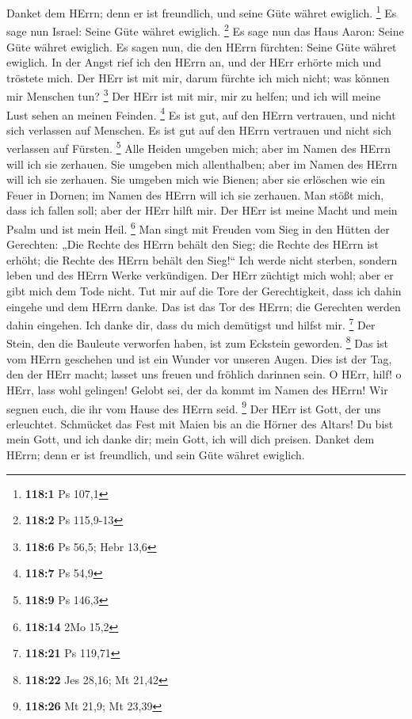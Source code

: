  Danket dem HErrn; denn er ist freundlich, und seine Güte
währet ewiglich. \footnote{\textbf{118:1} Ps 107,1}  Es
sage nun Israel: Seine Güte währet ewiglich. \footnote{\textbf{118:2} Ps
  115,9-13}  Es sage nun das Haus Aaron: Seine Güte währet
ewiglich.  Es sagen nun, die den HErrn fürchten: Seine
Güte währet ewiglich.  In der Angst rief ich den HErrn an,
und der HErr erhörte mich und tröstete mich.  Der HErr ist
mit mir, darum fürchte ich mich nicht; was können mir Menschen tun?
\footnote{\textbf{118:6} Ps 56,5; Hebr 13,6}  Der HErr ist
mit mir, mir zu helfen; und ich will meine Lust sehen an meinen Feinden.
\footnote{\textbf{118:7} Ps 54,9}  Es ist gut, auf den
HErrn vertrauen, und nicht sich verlassen auf Menschen. 
Es ist gut auf den HErrn vertrauen und nicht sich verlassen auf Fürsten.
\footnote{\textbf{118:9} Ps 146,3}  Alle Heiden umgeben
mich; aber im Namen des HErrn will ich sie zerhauen.  Sie
umgeben mich allenthalben; aber im Namen des HErrn will ich sie
zerhauen.  Sie umgeben mich wie Bienen; aber sie
erlöschen wie ein Feuer in Dornen; im Namen des HErrn will ich sie
zerhauen.  Man stößt mich, dass ich fallen soll; aber der
HErr hilft mir.  Der HErr ist meine Macht und mein Psalm
und ist mein Heil. \footnote{\textbf{118:14} 2Mo 15,2} 
Man singt mit Freuden vom Sieg in den Hütten der Gerechten: „Die Rechte
des HErrn behält den Sieg;  die Rechte des HErrn ist
erhöht; die Rechte des HErrn behält den Sieg!{}``  Ich
werde nicht sterben, sondern leben und des HErrn Werke verkündigen.
 Der HErr züchtigt mich wohl; aber er gibt mich dem Tode
nicht.  Tut mir auf die Tore der Gerechtigkeit, dass ich
dahin eingehe und dem HErrn danke.  Das ist das Tor des
HErrn; die Gerechten werden dahin eingehen.  Ich danke
dir, dass du mich demütigst und hilfst mir. \footnote{\textbf{118:21} Ps
  119,71}  Der Stein, den die Bauleute verworfen haben,
ist zum Eckstein geworden. \footnote{\textbf{118:22} Jes 28,16; Mt 21,42}
 Das ist vom HErrn geschehen und ist ein Wunder vor
unseren Augen.  Dies ist der Tag, den der HErr macht;
lasset uns freuen und fröhlich darinnen sein.  O HErr,
hilf! o HErr, lass wohl gelingen!  Gelobt sei, der da
kommt im Namen des HErrn! Wir segnen euch, die ihr vom Hause des HErrn
seid. \footnote{\textbf{118:26} Mt 21,9; Mt 23,39}  Der
HErr ist Gott, der uns erleuchtet. Schmücket das Fest mit Maien bis an
die Hörner des Altars!  Du bist mein Gott, und ich danke
dir; mein Gott, ich will dich preisen.  Danket dem HErrn;
denn er ist freundlich, und sein Güte währet ewiglich.

